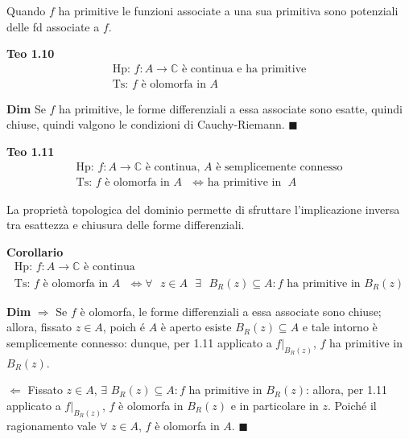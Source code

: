 \documentclass{article}
\begin{document}
Quando $f$ ha primitive le funzioni associate a una sua primitiva sono
potenziali delle fd associate a $f$.

\textbf{Teo 1.10}%
\begin{gather*}
\text{Hp: }f:A\rightarrow 
\mathbb{C}
\text{ \`{e} continua e ha primitive} \\
\text{Ts: }f\text{ \`{e} olomorfa in }A
\end{gather*}


\textbf{Dim} Se $f$ ha primitive, le forme differenziali a essa associate
sono esatte, quindi chiuse, quindi valgono le condizioni di Cauchy-Riemann. $%
\blacksquare $

\textbf{Teo 1.11}%
\begin{gather*}
\text{Hp: }f:A\rightarrow 
\mathbb{C}
\text{ \`{e} continua, }A\text{ \`{e} semplicemente connesso} \\
\text{Ts: }f\text{ \`{e} olomorfa in }A\text{ $\Longleftrightarrow $ ha
primitive in }A
\end{gather*}

La propriet\`{a} topologica del dominio permette di sfruttare l'implicazione
inversa tra esattezza e chiusura delle forme differenziali.

\textbf{Corollario}%
\begin{gather*}
\text{Hp: }f:A\rightarrow 
\mathbb{C}
\text{ \`{e} continua} \\
\text{Ts: }f\text{ \`{e} olomorfa in }A\text{ $\Longleftrightarrow \forall $ 
}z\in A\text{ }\exists \text{ }B_{R}\left( z\right) \subseteq A:f\text{ ha
primitive in }B_{R}\left( z\right)
\end{gather*}

\textbf{Dim} $\Longrightarrow $ Se $f$ \`{e} olomorfa, le forme
differenziali a essa associate sono chiuse; allora, fissato $z\in A$, poich%
\'{e} $A$ \`{e} aperto esiste $B_{R}\left( z\right) \subseteq A$ e tale
intorno \`{e} semplicemente connesso: dunque, per 1.11 applicato a $%
f|_{B_{R}\left( z\right) }$, $f$ ha primitive in $B_{R}\left( z\right) $.

$\Longleftarrow $ Fissato $z\in A$, $\exists $ $B_{R}\left( z\right)
\subseteq A:f$ ha primitive in $B_{R}\left( z\right) $: allora, per 1.11
applicato a $f|_{B_{R}\left( z\right) }$, $f$ \`{e} olomorfa in $B_{R}\left(
z\right) $ e in particolare in $z$. Poich\'{e} il ragionamento vale $\forall 
$ $z\in A$, $f$ \`{e} olomorfa in $A$. $\blacksquare $
\end{document}
